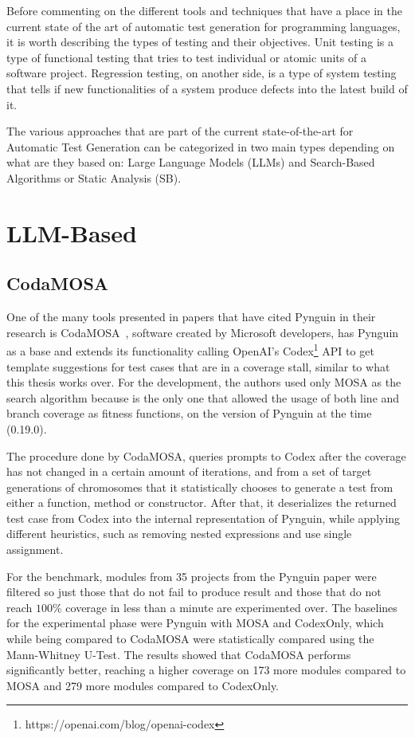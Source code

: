 \documentclass[%
  chapterprefix=false,%
  open=right,%
  twoside=true,%
  paper=a4,%
  logofile={Figures/logo.png},%
  thesistype=master,%
  UKenglish,%
]{se2thesis}
\begin{document}

Before commenting on the different tools and techniques that have a place in the current state of the art of automatic test generation for programming languages, it is worth describing the types of testing and their objectives. Unit testing is a type of functional testing that tries to test individual or atomic units of a software project.
Regression testing, on another side, is a type of system testing that tells if new functionalities of a system produce defects into the latest build of it.

The various approaches that are part of the current state-of-the-art for Automatic Test Generation can be categorized in two main types depending on what are they based on: Large Language Models (LLMs) and Search-Based Algorithms or Static Analysis (SB).

\section{LLM-Based}

\subsection*{CodaMOSA}

One of the many tools presented in papers that have cited Pynguin in their research is CodaMOSA~\cite{DBLP:conf/icse/LemieuxILS23}, software created by Microsoft developers, has Pynguin as a base and extends its functionality calling OpenAI's Codex\footnote{https://openai.com/blog/openai-codex} API to get template suggestions for test cases that are in a coverage stall, similar to what this thesis works over.
For the development, the authors used only MOSA as the search algorithm because is the only one that allowed the usage of both line and branch coverage as fitness functions, on the version of Pynguin at the time (0.19.0).

The procedure done by CodaMOSA, queries prompts to Codex after the coverage has not changed in a certain amount of iterations, and from a set of target generations of chromosomes that it statistically chooses to generate a test from either a function, method or constructor.
After that, it deserializes the returned test case from Codex into the internal representation of Pynguin, while applying different heuristics, such as removing nested expressions and use single assignment.

For the benchmark, modules from 35 projects from the Pynguin paper were filtered so just those that do not fail to produce result and those that do not reach \(100\%\) coverage in less than a minute are experimented over.
The baselines for the experimental phase were Pynguin with MOSA and CodexOnly, which while being compared to CodaMOSA were statistically compared using the Mann-Whitney U-Test.
The results showed that CodaMOSA performs significantly better, reaching a higher coverage on 173 more modules compared to MOSA and 279 more modules compared to CodexOnly.
\end{document}
